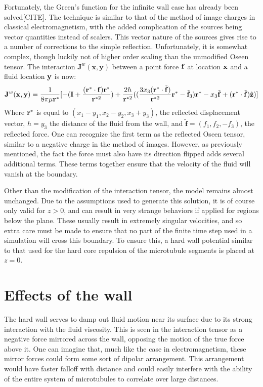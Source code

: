 \documentclass[11pt]{ucthesis}
\def\br{{\bf r}}
\begin{document}
Fortunately, the Green's function for the infinite wall case has already been solved[CITE]. The technique is  similar to that of the method of image charges in classical electromagnetism, with the added complication of the sources being vector quantities instead of scalers. This vector nature of the sources gives rise to a number of corrections to the simple reflection.
Unfortunately, it is somewhat complex, though luckily not of higher order scaling than the unmodified Oseen tensor. The interaction $\mathbf{J}^w(\mathbf{x},\mathbf{y})$ between a point force $\bf f$ at location $\bf x$ and a fluid location $\bf y$ is now:
\begin{equation}
\label{eq:oseenwall}
\mathbf{J}^w(\mathbf{x}, \mathbf{y}) = \frac{1}{8\pi\mu \br^*} [ 
- (\mathbf{I} + \frac{(\br^*\cdot\mathbf{f})\br^*}{\br^{*2}}) 
+ \frac{2 h}{\br^{*2}}( (\frac{3 x_3(\br^*\cdot\tilde{\mathbf{f}})}{\br^{*2}} \br^* - \tilde{\mathbf{f}}_3)\br^* - x_3\tilde{\mathbf{f}} + (\br^*\cdot\tilde{\mathbf{f}})\hat{\mathbf{z}})]
\end{equation}
Where $\br^*$ is equal to $(x_1-y_1,x_2-y_2,x_3+y_3)$, the reflected displacement vector, $h = y_3$ the distance of the fluid from the wall, and $\tilde{\mathbf{f}} = (f_1,f_2,-f_3)$, the reflected force. 
One can recognize the first term as the reflected Oseen tensor, similar to a negative charge in the method of images. 
However, as previously mentioned, the fact the force must also have its direction flipped adds several additional terms. These terms together ensure that the velocity of the fluid will vanish at the boundary.

Other than the modification of the interaction tensor, the model remains almost unchanged.
Due to the assumptions used to generate this solution, it is of course only valid for $z>0$, and can result in very strange behaviors if applied for regions below the plane. 
These usually result in extremely singular velocities, and so extra care must be made to ensure that no part of the finite time step used in a simulation will cross this boundary. 
To ensure this, a hard wall potential similar to that used for the hard core repulsion of the microtubule segments is placed at $z=0$.

\section{Effects of the wall}
The hard wall serves to damp out fluid motion near its surface due to its strong interaction with the fluid viscosity. 
This is seen in the interaction tensor as a negative force mirrored across the wall, opposing the motion of the true force above it.
One can imagine that, much like the case in electromagnetism, these mirror forces could form some sort of dipolar arrangement. 
This arrangement would have faster falloff with distance and could easily interfere with the ability of the entire system of microtubules to correlate over large distances.
\end{document}
